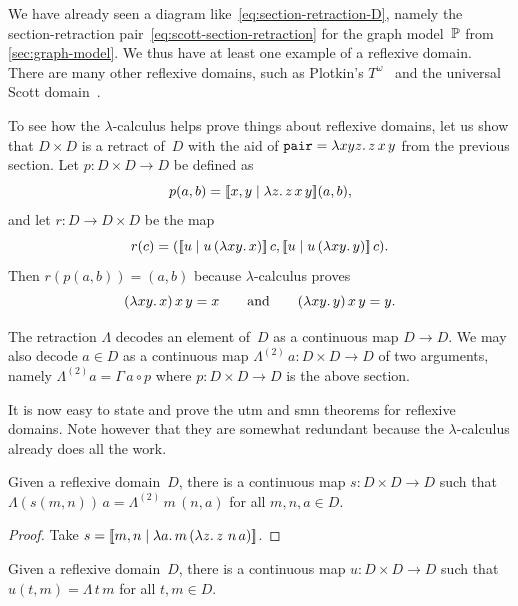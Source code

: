 We have already seen a diagram like~\eqref{eq:section-retraction-D}, namely the section-retraction pair~\eqref{eq:scott-section-retraction} for the graph model~$\mathbb{P}$ from \cref{sec:graph-model}. We thus have at least one example of a reflexive domain.
There are many other reflexive domains, such as Plotkin's $T^\omega$~ and the universal Scott domain~.


To see how the $\lambda$-calculus helps prove things about reflexive
domains, let us show that $D \times D$ is a retract of~$D$ with the aid of
$\mathtt{pair} = \lambda x y z .\,z\,x\,y$ from the previous section. Let $p : D
\times D \to D$ be defined as
%
\begin{equation*}
  p (a, b) = [\![x,y \mid \lambda z .\,z\,x\,y]\!](a,b),
\end{equation*}
%
and let $r : D \to D \times D$ be the map
%
\begin{equation*}
  r(c) = ([\![u \mid u\,(\lambda x y .\,x)]\!] \, c,
          [\![u \mid u\,(\lambda x y .\,y)]\!] \, c).
\end{equation*}
%
Then $r (p (a, b)) = (a, b)$ because $\lambda$-calculus proves
%
\begin{equation*}
  (\lambda x y .\,x)\, x \, y = x
  \qquad\text{and}\qquad
  (\lambda x y .\,y)\, x \, y = y.
\end{equation*}

The retraction $\Lambda$ decodes an element of~$D$ as a continuous map $D \to D$. We may also decode $a \in D$ as a continuous map $\Lambda^{(2)}\, a : D \times D \to D$ of two arguments, namely $\Lambda^{(2)} a = \Gamma \, a \circ p$ where $p : D \times D \to D$ is the above section.

It is now easy to state and prove the utm and smn theorems for reflexive domains. Note however that they are somewhat redundant because the $\lambda$-calculus already does all the work.

\begin{theorem}
  Given a reflexive domain~$D$,
  there is a continuous map $s : D \times D \to D$ such that $\Lambda (s(m, n)) \, a = \Lambda^{(2)} \, m \, (n, a)$ for all $m, n, a \in D$.
\end{theorem}

\begin{proof}
  Take $s = [\![m, n \mid \lambda a .\,m \,(\lambda z .\,z\,\,n\,a)]\!]$.
\end{proof}

\begin{theorem}
  Given a reflexive domain~$D$, there is a continuous map $u : D \times D \to D$ such that $u (t, m) = \Lambda\,t\,m$ for all $t, m \in D$.
\end{theorem}

